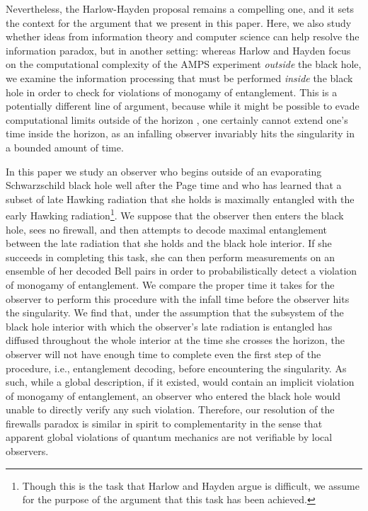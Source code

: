 \documentclass[a4paper,11pt]{article}
\theoremstyle{definition}
\begin{document}
Nevertheless, the Harlow-Hayden proposal remains a compelling one, and it sets the context for the argument that we present in this paper. Here, we also study whether ideas from information theory and computer science can help resolve the information paradox, but in another setting: whereas Harlow and Hayden focus on the computational complexity of the AMPS experiment \emph{outside} the black hole, we examine the information processing that must be performed \emph{inside} the black hole in order to check for violations of monogamy of entanglement. This is a potentially different line of argument, because while it might be possible to evade computational limits outside of the horizon \cite{Almheiri:2013hfa,Oppenheim:2014gfa}, one certainly cannot extend one's time inside the horizon, as an infalling observer invariably hits the singularity in a bounded amount of time.

In this paper we study an observer who begins outside of an evaporating Schwarzschild black hole well after the Page time and who has learned that a subset of late Hawking radiation that she holds is maximally entangled with the early Hawking radiation\footnote{Though this is the task that Harlow and Hayden argue is difficult, we assume for the purpose of the argument that this task has been achieved.}.
We suppose that the observer then enters the black hole, sees no firewall, and then attempts to decode maximal entanglement between the late radiation that she holds and the black hole interior.
If she succeeds in completing this task, she can then perform measurements on an ensemble of her decoded Bell pairs in order to probabilistically detect a violation of monogamy of entanglement.
We compare the proper time it takes for the observer to perform this procedure with the infall time before the observer hits the singularity.
We find that, under the assumption that the subsystem of the black hole interior with which the observer's late radiation is entangled has diffused throughout the whole interior at the time she crosses the horizon, the observer will not have enough time to complete even the first step of the procedure, i.e., entanglement decoding, before encountering the singularity. As such, while a global description, if it existed, would contain an implicit violation of monogamy of entanglement, an observer who entered the black hole would unable to directly verify any such violation.
Therefore, our resolution of the firewalls paradox is similar in spirit to complementarity \cite{Susskind:1993if} in the sense that apparent global violations of quantum mechanics are not verifiable by local observers.
\end{document}
